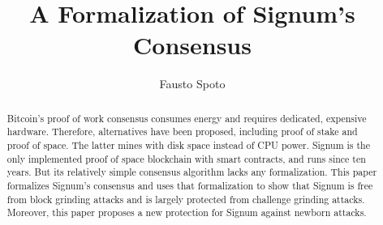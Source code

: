 \documentclass{llncs}
\begin{document}
\begin{frontmatter}

  \title{A Formalization of Signum's Consensus}

  \author{Fausto Spoto}


  \maketitle

  \begin{abstract}
    Bitcoin's proof of work consensus consumes energy and requires
    dedicated, expensive hardware. Therefore, alternatives have been proposed,
    including proof of stake and proof of space. The latter mines with
    disk space instead of CPU power. Signum is the only implemented
    proof of space blockchain with smart contracts, and
    runs since ten years. But its relatively simple
    consensus algorithm lacks any formalization.
    This paper formalizes Signum's consensus and uses that formalization
    to show that Signum is free from block grinding attacks and is largely
    protected from challenge grinding attacks. Moreover, this paper proposes
    a new protection for Signum against newborn attacks.
  \end{abstract}

\end{frontmatter}














\end{document}
